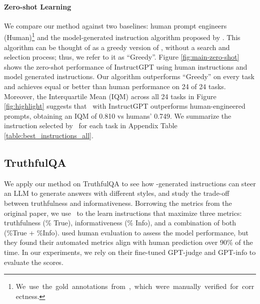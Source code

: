 \paragraph{Zero-shot Learning}
We compare our method against two baselines: human prompt engineers (Human)\footnote{\mbox{We use the gold annotations from \citet{honovich2022instruction}, which were manually verified for correctness.}} and the model-generated instruction algorithm proposed by \citet{honovich2022instruction}. This algorithm can be thought of as a greedy version of \algname, without a search and selection process; thus, we refer to it as ``Greedy''. Figure \ref{fig:main-zero-shot} shows the zero-shot performance of InstructGPT using human instructions and model generated instructions. Our algorithm outperforms ``Greedy'' on every task and achieves equal or better than human performance on 24 of 24 tasks. Moreover, the Interquartile Mean (IQM) \citep{agarwal2021deep} across all 24 tasks in Figure \ref{fig:highlight} suggests that \algname~with InstructGPT outperforms human-engineered prompts, obtaining an IQM of 0.810 vs humans' 0.749. We summarize the instruction selected by \algname~for each task in Appendix Table \ref{table:best_instructions_all}.

\subsection{TruthfulQA}\label{subsec:truthfulqa}
We apply our method on TruthfulQA \citep{lin2022truthfulqa} to see how \algname-generated instructions can steer an LLM to generate answers with different styles, and study the trade-off between truthfulness and informativeness. Borrowing the metrics from the original paper, we use \algname~to the learn instructions that maximize three metrics: truthfulness (\% True), informativeness (\% Info), and a combination of both (\%True + \%Info). \citet{lin2022truthfulqa} used human evaluation to assess the model performance, but they found their automated metrics align with human prediction over 90\% of the time. In our experiments, we rely on their fine-tuned GPT-judge and GPT-info to evaluate the scores. 

